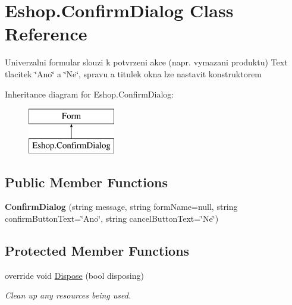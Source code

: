 \hypertarget{class_eshop_1_1_confirm_dialog}{}\section{Eshop.\+Confirm\+Dialog Class Reference}
\label{class_eshop_1_1_confirm_dialog}


Univerzalni formular slouzi k potvrzeni akce (napr. vymazani produktu) Text tlacitek \char`\"{}\+Ano\char`\"{} a \char`\"{}\+Ne\char`\"{}, spravu a titulek okna lze nastavit konstruktorem  


Inheritance diagram for Eshop.\+Confirm\+Dialog\+:\begin{figure}[H]
\begin{center}
\leavevmode
\includegraphics[height=2.000000cm]{class_eshop_1_1_confirm_dialog}
\end{center}
\end{figure}
\subsection*{Public Member Functions}
\begin{DoxyCompactItemize}
\item 
\mbox{\label{class_eshop_1_1_confirm_dialog_acc6480225170eaa685ecce1ba75b6475}} 
{\bfseries Confirm\+Dialog} (string message, string form\+Name=null, string confirm\+Button\+Text=\char`\"{}Ano\char`\"{}, string cancel\+Button\+Text=\char`\"{}Ne\char`\"{})
\end{DoxyCompactItemize}
\subsection*{Protected Member Functions}
\begin{DoxyCompactItemize}
\item 
override void \mbox{\hyperlink{class_eshop_1_1_confirm_dialog_a5384ad9f77d45bb6d1d37af050c64c3d}{Dispose}} (bool disposing)
\begin{DoxyCompactList}\small\item\em Clean up any resources being used. \end{DoxyCompactList}\end{DoxyCompactItemize}


